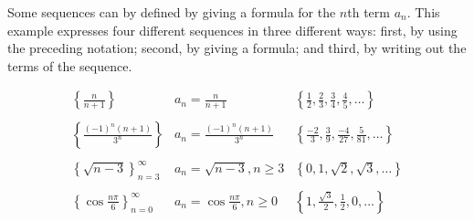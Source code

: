 \begin{frame}
Some sequences can by defined by giving a formula for the $n$th term $a_n$.  This example expresses four different sequences in three different ways: first, by using the preceding notation; second, by giving a formula; and third, by writing out the terms of the sequence.
\begin{example}[Example 1, p. 711]
\[
\begin{array}{lll}
\left\{ \frac{n}{n+1}\right\} &%
a_n = \frac{n}{n+1} &%
\left\{ \frac{1}{2}, \frac{2}{3}, \frac{3}{4}, \frac{4}{5}, \ldots \right\}\\%
&&\\%
\left\{ \frac{(-1)^n(n+1)}{3^n}\right\} &%
a_n = \frac{(-1)^n(n+1)}{3^n} &%
\left\{ \frac{-2}{3}, \frac{3}{9}, \frac{-4}{27}, \frac{5}{81}, \ldots \right\}\\%
&&\\%
\left\{ \sqrt{n-3}\right\}_{n=3}^\infty &%
a_n = \sqrt{n-3}, n\geq 3&%
\left\{ 0, 1, \sqrt{2}, \sqrt{3}, \ldots \right\}\\%
&&\\%
\left\{ \cos \frac{n\pi}{6}\right\}_{n=0}^\infty &%
a_n = \cos \frac{n\pi}{6}, n\geq 0&%
\left\{ 1, \frac{\sqrt{3}}{2}, \frac{1}{2}, 0, \ldots \right\}\\%
\end{array}
\]
\end{example}
\end{frame}
